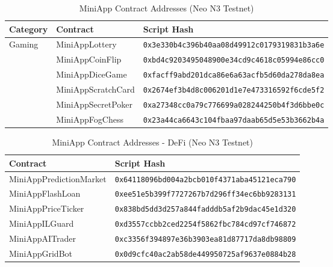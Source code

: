 \documentclass[11pt,a4paper]{article}
\begin{document}
\begin{table}[h]
\centering
\caption{MiniApp Contract Addresses (Neo N3 Testnet)}
\scriptsize
\begin{tabular}{@{}lll@{}}
\toprule
\textbf{Category} & \textbf{Contract} & \textbf{Script Hash} \\
\midrule
\multirow{6}{*}{Gaming} & MiniAppLottery & \texttt{0x3e330b4c396b40aa08d49912c0179319831b3a6e} \\
 & MiniAppCoinFlip & \texttt{0xbd4c9203495048900e34cd9c4618c05994e86cc0} \\
 & MiniAppDiceGame & \texttt{0xfacff9abd201dca86e6a63acfb5d60da278da8ea} \\
 & MiniAppScratchCard & \texttt{0x2674ef3b4d8c006201d1e7e473316592f6cde5f2} \\
 & MiniAppSecretPoker & \texttt{0xa27348cc0a79c776699a028244250b4f3d6bbe0c} \\
 & MiniAppFogChess & \texttt{0x23a44ca6643c104fbaa97daab65d5e53b3662b4a} \\
\bottomrule
\end{tabular}
\label{tab:miniapps-gaming-addresses}
\end{table}

\begin{table}[h]
\centering
\caption{MiniApp Contract Addresses - DeFi (Neo N3 Testnet)}
\scriptsize
\begin{tabular}{@{}ll@{}}
\toprule
\textbf{Contract} & \textbf{Script Hash} \\
\midrule
MiniAppPredictionMarket & \texttt{0x64118096bd004a2bcb010f4371aba45121eca790} \\
MiniAppFlashLoan & \texttt{0xee51e5b399f7727267b7d296ff34ec6bb9283131} \\
MiniAppPriceTicker & \texttt{0x838bd5dd3d257a844fadddb5af2b9dac45e1d320} \\
MiniAppILGuard & \texttt{0xd3557ccbb2ced2254f5862fbc784cd97cf746872} \\
MiniAppAITrader & \texttt{0xc3356f394897e36b3903ea81d87717da8db98809} \\
MiniAppGridBot & \texttt{0x0d9cfc40ac2ab58de449950725af9637e0884b28} \\
\bottomrule
\end{tabular}
\label{tab:miniapps-defi-addresses}
\end{table}
\end{document}
